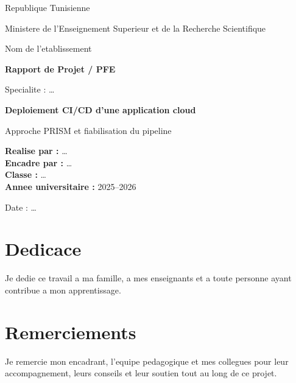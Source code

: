 \documentclass[12pt,a4paper]{report}
\begin{document}
\begin{titlepage}
  \centering
  {\large Republique Tunisienne\par}
  {\large Ministere de l'Enseignement Superieur et de la Recherche Scientifique\par}
  \vspace{0.8cm}
  {\Large Nom de l'etablissement\par}
  \vspace{1.2cm}

  {\Large \textbf{Rapport de Projet / PFE}\par}
  \vspace{0.5cm}
  {\large Specialite : \ldots\par}
  \vspace{1.2cm}

  {\Huge \textbf{Deploiement CI/CD d'une application cloud}\par}
  \vspace{0.3cm}
  {\Large Approche PRISM et fiabilisation du pipeline\par}
  \vspace{1.5cm}

  \begin{flushleft}
    \textbf{Realise par :} \ldots\\
    \textbf{Encadre par :} \ldots\\
    \textbf{Classe :} \ldots\\
    \textbf{Annee universitaire :} 2025--2026
  \end{flushleft}

  \vfill
  {\large Date : \ldots\par}
\end{titlepage}

\chapter*{Dedicace}
Je dedie ce travail a ma famille, a mes enseignants et a toute personne ayant contribue a mon apprentissage.

\chapter*{Remerciements}
Je remercie mon encadrant, l'equipe pedagogique et mes collegues pour leur accompagnement,
leurs conseils et leur soutien tout au long de ce projet.
\end{document}
